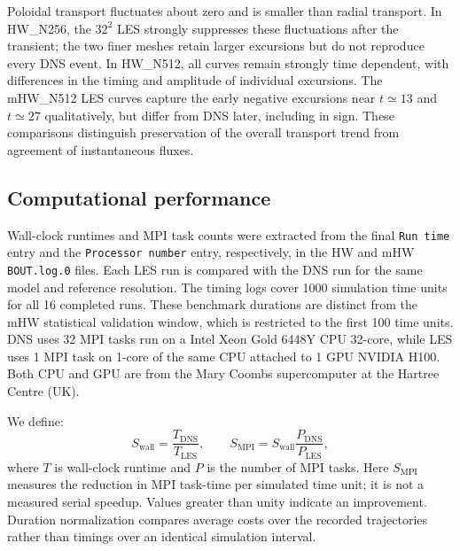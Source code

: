 \documentclass[authoryear,preprint,review,12pt]{elsarticle}
\begin{document}
Poloidal transport fluctuates about zero and is smaller than radial transport. In HW\_N256, the $32^2$ LES strongly suppresses these fluctuations after the transient; the two finer meshes retain larger excursions but do not reproduce every DNS event. In HW\_N512, all curves remain strongly time dependent, with differences in the timing and amplitude of individual excursions. The mHW\_N512 LES curves capture the early negative excursions near $t\simeq13$ and $t\simeq27$ qualitatively, but differ from DNS later, including in sign. These comparisons distinguish preservation of the overall transport trend from agreement of instantaneous fluxes.


\subsection{Computational performance}

Wall-clock runtimes and MPI task counts were extracted from the final \texttt{Run time} entry and the \texttt{Processor number} entry, respectively, in the HW and mHW \texttt{BOUT.log.0} files. Each LES run is compared with the DNS run for the same model and reference resolution. The timing logs cover 1000 simulation time units for all 16 completed runs. These benchmark durations are distinct from the mHW statistical validation window, which is restricted to the first 100 time units. DNS uses 32 MPI tasks run on a Intel Xeon Gold 6448Y CPU 32-core, while LES uses 1 MPI task on 1-core of the same CPU attached to 1 GPU NVIDIA H100. Both CPU and GPU are from the
Mary Coombs supercomputer at the Hartree Centre (UK). 

We define:
\begin{equation}
    S_{\mathrm{wall}}=
    \frac{T_{\mathrm{DNS}}}{T_{\mathrm{LES}}},
    \qquad
    S_{\mathrm{MPI}}=S_{\mathrm{wall}}
    \frac{P_{\mathrm{DNS}}}{P_{\mathrm{LES}}},
\end{equation}
where $T$ is wall-clock runtime and $P$ is the number of MPI tasks. Here $S_{\mathrm{MPI}}$ measures the reduction in MPI task-time per simulated time unit; it is not a measured serial speedup. Values greater than unity indicate an improvement. Duration normalization compares average costs over the recorded trajectories rather than timings over an identical simulation interval.
\end{document}
